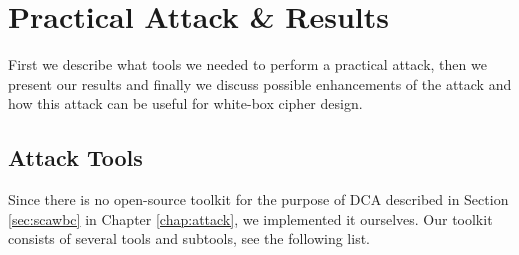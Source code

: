 \chapter{Practical Attack \& Results}
\label{chap:results}

First we describe what tools we needed to perform a practical attack, then we present our results and finally we discuss possible enhancements of the attack and how this attack can be useful for white-box cipher design.

\section{Attack Tools}

Since there is no open-source toolkit for the purpose of DCA described in Section \ref{sec:scawbc} in Chapter \ref{chap:attack}, we implemented it ourselves. Our toolkit consists of several tools and subtools, see the following list.
